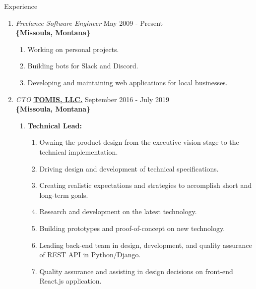 \documentclass[oneside]{article}%
\begin{document}
 
\onecolumn


\renewcommand{\footrulewidth}{1pt}


\noindent
\huge{Experience}
\small
\begin{enumerate}[]
	\item \textit{Freelance Software Engineer} \hfill May 2009 - Present\\
		\textbf{\{Missoula, Montana\}}
		\begin{enumerate}[*]
			\item Working on personal projects.
			\item Building bots for Slack and Discord.
			\item Developing and maintaining web applications for local businesses.
		\end{enumerate}
	\item \textit{CTO} \textbf{\href{https://tomis.tech}{TOMIS, LLC.}} \hfill September 2016 - July 2019\\
		\textbf{\{Missoula, Montana\}}
		\begin{enumerate}[]
			\item \textbf{Technical Lead:}
				\begin{enumerate}[-]
					\item Owning the product design from the executive vision stage to the technical implementation.
					\item Driving design and development of technical specifications.
					\item Creating realistic expectations and strategies to accomplish short and long-term goals.
					\item Research and development on the latest technology.
					\item Building prototypes and proof-of-concept on new technology.
					\item Leading back-end team in design, development, and quality assurance of REST API in Python/Django.
					\item Quality assurance and assisting in design decisions on front-end React.js application.

\end{enumerate}
\end{enumerate}
\end{enumerate}
\end{document}
